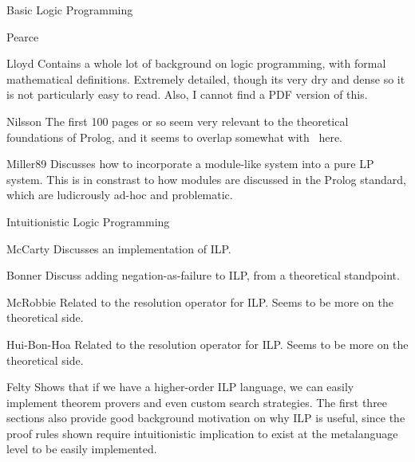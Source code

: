 \begin{pgroup}{Basic Logic Programming}
  \begin{paper}{Pearce}
    \mustread
  \end{paper}

  \begin{paper}{Lloyd}
    Contains a whole lot of background on logic programming, with formal mathematical definitions.
    Extremely detailed, though its very dry and dense so it is not particularly easy to read.
    Also, I cannot find a PDF version of this.

    \mustread
  \end{paper}

  \begin{paper}{Nilsson}
    The first 100 pages or so seem very relevant to the theoretical foundations of Prolog, and it seems to overlap somewhat with~\cite{Lloyd} here.

    \mustread
  \end{paper}

  \begin{paper}{Miller89}
    Discusses how to incorporate a module-like system into a pure LP system.
    This is in constrast to how modules are discussed in the Prolog standard, which are ludicrously ad-hoc and problematic.
    \mustread
  \end{paper}
\end{pgroup}

\begin{pgroup}{Intuitionistic Logic Programming}
  \begin{paper}{McCarty}
    Discusses an implementation of ILP.
    \mustread
  \end{paper}

  \begin{paper}{Bonner}
    Discuss adding negation-as-failure to ILP, from a theoretical standpoint.
    \mustread
  \end{paper}

  \begin{paper}{McRobbie}
    Related to the resolution operator for ILP.
    Seems to be more on the theoretical side.
    \mustread
  \end{paper}

  \begin{paper}{Hui-Bon-Hoa}
    Related to the resolution operator for ILP.
    Seems to be more on the theoretical side.
    \mustread
  \end{paper}

  \begin{paper}{Felty}
    Shows that if we have a higher-order ILP language, we can easily implement theorem provers and even custom search strategies.
    The first three sections also provide good background motivation on why ILP is useful, since the proof rules shown require intuitionistic implication to exist at the metalanguage level to be easily implemented.
    \mustread
  \end{paper}
\end{pgroup}

